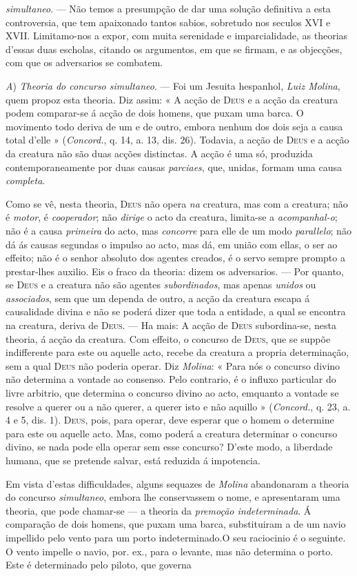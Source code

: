 \emph{simultaneo}. --- Não temos a presumpção de dar uma solução definitiva a esta controversia, que tem apaixonado tantos sabios, sobretudo nos seculos XVI e XVII. Limitamo-nos a expor, com muita serenidade e imparcialidade, as theorias d'essas duas escholas, citando os argumentos, em que se firmam, e as objecções, com que os adversarios se combatem.\par \emph{A}) \emph{Theoria do concurso simultaneo}. --- Foi um Jesuita hespanhol, \emph{Luiz Molina}, quem propoz esta theoria. Diz assim: « A acção de \textsc{Deus} e a acção da creatura podem comparar-se á acção de dois homens, que puxam uma barca. O movimento todo deriva de um e de outro, embora nenhum dos dois seja a causa total d'elle » (\emph{Concord.}, q. 14, a. 13, dis. 26). Todavia, a acção de \textsc{Deus} e a acção da creatura não são duas acções distinctas. A acção é uma só, produzida contemporaneamente por duas causas \emph{parciaes}, que, unidas, formam uma causa \emph{completa}.\par Como se vê, nesta theoria, \textsc{Deus} não opera \emph{na} creatura, mas com a creatura; não é \emph{motor}, é \emph{cooperador}; não \emph{dirige} o acto da creatura, limita-se a \emph{acompanhal-o}; não é a causa \emph{primeira} do acto, mas \emph{concorre} para elle de um modo \emph{parallelo}; não dá ás causas segundas o impulso ao acto, mas dá, em união com ellas, o ser ao effeito; não é o senhor absoluto dos agentes creados, é o servo sempre prompto a prestar-lhes auxilio. Eis o fraco da theoria: dizem os adversarios. --- Por quanto, se \textsc{Deus} e a creatura não são agentes \emph{subordinados}, mas apenas \emph{unidos} ou \emph{associados}, sem que um dependa de outro, a acção da creatura escapa á causalidade divina e não se poderá dizer que toda a entidade, a qual se encontra na creatura, deriva de \textsc{Deus}. --- Ha mais: A acção de \textsc{Deus} subordina-se, nesta theoria, á acção da creatura. Com effeito, o concurso de \textsc{Deus}, que se suppõe indifferente para este ou aquelle acto, recebe da creatura a propria determinação, sem a qual \textsc{Deus} não poderia operar. Diz \emph{Molina}: « Para nós o concurso divino não determina a vontade ao consenso. Pelo contrario, é o influxo particular do livre arbitrio, que determina o concurso divino ao acto, emquanto a vontade se resolve a querer ou a não querer, a querer isto e não aquillo » (\emph{Concord.}, q. 23, a. 4 e 5, dis. 1). \textsc{Deus}, pois, para operar, deve esperar que o homem o determine para este ou aquelle acto. Mas, como poderá a creatura determinar o concurso divino, se nada pode ella operar sem esse concurso? D'este modo, a liberdade humana, que se pretende salvar, está reduzida á impotencia.\par Em vista d'estas difficuldades, alguns sequazes de \emph{Molina} abandonaram a theoria do concurso \emph{simultaneo}, embora lhe conservassem o nome, e apresentaram uma theoria, que pode chamar-se --- a theoria da \emph{premoção indeterminada}. Á comparação de dois homens, que puxam uma barca, substituiram a de um navio impellido pelo vento para um porto indeterminado.O seu raciocinio é o seguinte. O vento impelle o navio, por. ex., para o levante, mas não determina o porto. Este é determinado pelo piloto, que governa 
